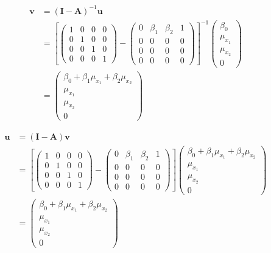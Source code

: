 \documentclass[
]{book}
\theoremstyle{definition}
\theoremstyle{definition}
\theoremstyle{definition}
\theoremstyle{remark}
\begin{document}
\begin{align*}\mathbf{v} &=\left( \mathbf{I} - \mathbf{A} \right)^{-1} \mathbf{u}\\ &=\left[\left( \begin{array}{cccc} 1 & 0 & 0 & 0 \\ 0 & 1 & 0 & 0 \\ 0 & 0 & 1 & 0 \\ 0 & 0 & 0 & 1 \end{array} \right)-\left( \begin{array}{cccc} 0 & \beta  _{1} & \beta  _{2} & 1 \\ 0 & 0 & 0 & 0 \\ 0 & 0 & 0 & 0 \\ 0 & 0 & 0 & 0 \end{array} \right)\right]^{\mathsf{-1}}\left( \begin{array}{c} \beta  _{0} \\ \mu  _{x _{1}} \\ \mu  _{x _{2}} \\ 0 \end{array} \right)\\ &=\left( \begin{array}{c} \beta  _{0} + \beta  _{1} \mu  _{x _{1}} + \beta  _{2} \mu  _{x _{2}} \\ \mu  _{x _{1}} \\ \mu  _{x _{2}} \\ 0 \end{array} \right)\end{align*}

\begin{align*}\mathbf{u} &=\left( \mathbf{I} - \mathbf{A} \right) \mathbf{v}\\ &=\left[\left( \begin{array}{cccc} 1 & 0 & 0 & 0 \\ 0 & 1 & 0 & 0 \\ 0 & 0 & 1 & 0 \\ 0 & 0 & 0 & 1 \end{array} \right)-\left( \begin{array}{cccc} 0 & \beta  _{1} & \beta  _{2} & 1 \\ 0 & 0 & 0 & 0 \\ 0 & 0 & 0 & 0 \\ 0 & 0 & 0 & 0 \end{array} \right)\right]\left( \begin{array}{c} \beta  _{0} + \beta  _{1} \mu  _{x _{1}} + \beta  _{2} \mu  _{x _{2}} \\ \mu  _{x _{1}} \\ \mu  _{x _{2}} \\ 0 \end{array} \right)\\ &=\left( \begin{array}{c} \beta  _{0} + \beta  _{1} \mu  _{x _{1}} + \beta  _{2} \mu  _{x _{2}} \\ \mu  _{x _{1}} \\ \mu  _{x _{2}} \\ 0 \end{array} \right)\end{align*}
\end{document}
